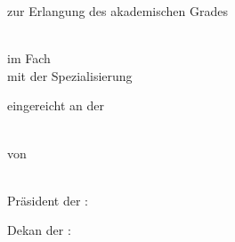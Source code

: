 \makeatletter
\begin{titlepage}
\begin{spacing}{1}
  \setlength{\parindentbak}{\parindent}
  \setlength{\parskipbak}{\parskip}

\setlength{\parindent}{0pt}
\setlength{\parskip}{\baselineskip}

\thispagestyle{empty}

\expandafter\Hu@titlepagefont\expandafter

\begin{center}
{\LARGE \textbf{\ifx\Hu@doctitle\empty{}\else\Hu@doctitle\fi}}

\ifx\Hu@docsubtitle\empty{}\else\Hu@docsubtitle\fi


zur Erlangung des akademischen Grades

\ifx\Hu@degree\empty{}\else\Hu@degree\fi\\
im Fach
\ifx\Hu@subject\empty{}\else\Hu@subject\fi\\
mit der Spezialisierung
\ifx\Hu@specialization\empty{}\else\Hu@specialization\fi


eingereicht an der\\
\ifx\Hu@faculty\empty{}\else\Hu@faculty\fi\\
\ifx\Hu@university\empty{}\else\Hu@university\fi

von\\
\textbf{\ifx\Hu@authorprefix\empty{}\else\Hu@authorprefix\fi\ \ifx\Hu@authorfirstname\empty{}\else\Hu@authorfirstname\fi\ \ifx\Hu@authorsurname\empty{}\else\Hu@authorsurname\fi\ \ifx\Hu@authorsuffix\empty{}\else\Hu@authorsuffix\fi}\\
\ifx\Hu@authoradd\empty{}\else\Hu@authoradd\fi
\end{center}

\vfill

Pr\"asident der \ifx\Hu@university\empty{}\else\Hu@university\fi:\\
\ifx\Hu@president\empty{}\else\Hu@president\fi

Dekan der \ifx\Hu@faculty\empty{}\else\Hu@faculty\fi:\\
\ifx\Hu@dean\empty{}\else\Hu@dean\fi


\end{spacing}
\end{titlepage}
